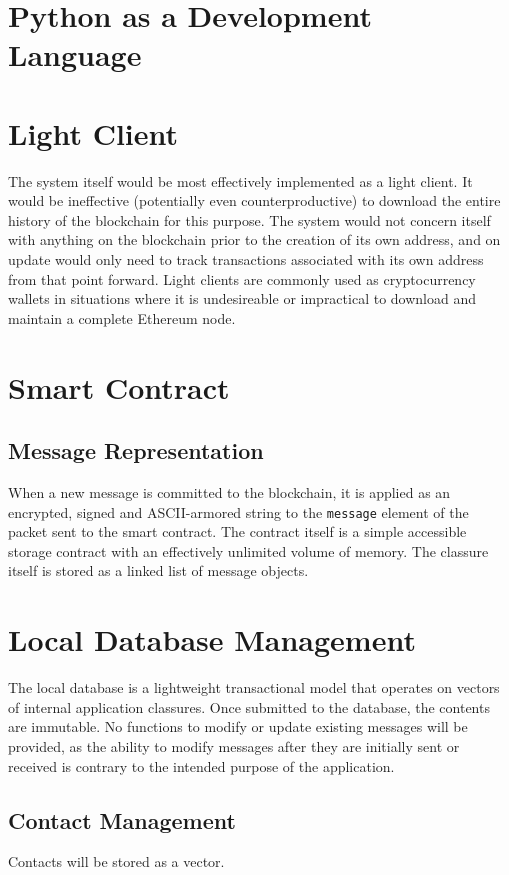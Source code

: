 \documentclass[]{article}
\begin{document}
\section{Python as a Development Language}

\section{Light Client}
The system itself would be most effectively implemented as a light client. It would be ineffective (potentially even counterproductive) to download the entire history of the blockchain for this purpose. The system would not concern itself with anything on the blockchain prior to the creation of its own address, and on update would only need to track transactions associated with its own address from that point forward. Light clients are commonly used as cryptocurrency wallets in situations where it is undesireable or impractical to download and maintain a complete Ethereum node.

\section{Smart Contract}
\subsection{Message Representation}
When a new message is committed to the blockchain, it is applied as an encrypted, signed and ASCII-armored string to the \verb!message! element of the packet sent to the smart contract. The contract itself is a simple accessible storage contract with an effectively unlimited volume of memory. The classure itself is stored as a linked list of message objects.

\section{Local Database Management}
The local database is a lightweight transactional model that operates on vectors of internal application classures. Once submitted to the database, the contents are immutable. No functions to modify or update existing messages will be provided, as the ability to modify messages after they are initially sent or received is contrary to the intended purpose of the application.
\subsection{Contact Management}
Contacts will be stored as a vector.
\end{document}

